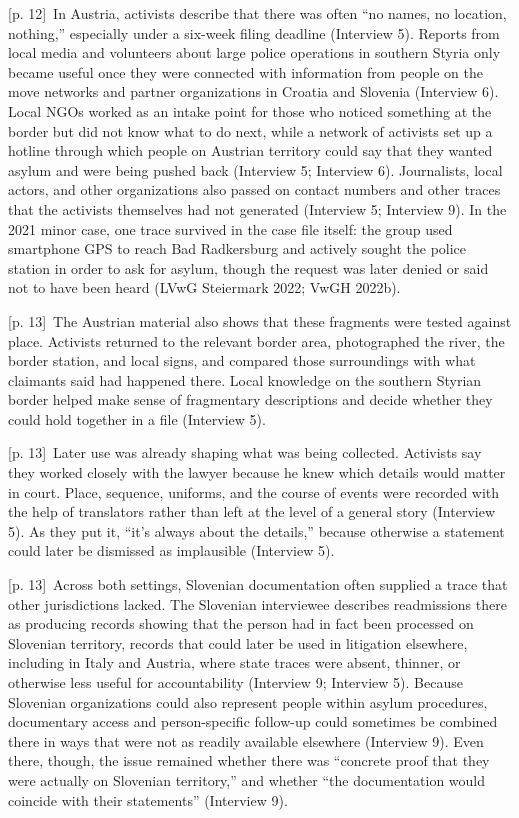 \documentclass[10pt,a4paper]{article}
\begin{document}
{\scriptsize\color{gray} [p. 12]}\ In Austria, activists describe that there was often “no names, no location, nothing,” especially under a six-week filing deadline (Interview 5). Reports from local media and volunteers about large police operations in southern Styria only became useful once they were connected with information from people on the move networks and partner organizations in Croatia and Slovenia (Interview 6). Local NGOs worked as an intake point for those who noticed something at the border but did not know what to do next, while a network of activists set up a hotline through which people on Austrian territory could say that they wanted asylum and were being pushed back (Interview 5; Interview 6). Journalists, local actors, and other organizations also passed on contact numbers and other traces that the activists themselves had not generated (Interview 5; Interview 9). In the 2021 minor case, one trace survived in the case file itself: the group used smartphone GPS to reach Bad Radkersburg and actively sought the police station in order to ask for asylum, though the request was later denied or said not to have been heard (LVwG Steiermark 2022; VwGH 2022b).\par
{\scriptsize\color{gray} [p. 13]}\ The Austrian material also shows that these fragments were tested against place. Activists returned to the relevant border area, photographed the river, the border station, and local signs, and compared those surroundings with what claimants said had happened there. Local knowledge on the southern Styrian border helped make sense of fragmentary descriptions and decide whether they could hold together in a file (Interview 5).\par
{\scriptsize\color{gray} [p. 13]}\ Later use was already shaping what was being collected. Activists say they worked closely with the lawyer because he knew which details would matter in court. Place, sequence, uniforms, and the course of events were recorded with the help of translators rather than left at the level of a general story (Interview 5). As they put it, “it’s always about the details,” because otherwise a statement could later be dismissed as implausible (Interview 5).\par
{\scriptsize\color{gray} [p. 13]}\ Across both settings, Slovenian documentation often supplied a trace that other jurisdictions lacked. The Slovenian interviewee describes readmissions there as producing records showing that the person had in fact been processed on Slovenian territory, records that could later be used in litigation elsewhere, including in Italy and Austria, where state traces were absent, thinner, or otherwise less useful for accountability (Interview 9; Interview 5). Because Slovenian organizations could also represent people within asylum procedures, documentary access and person-specific follow-up could sometimes be combined there in ways that were not as readily available elsewhere (Interview 9). Even there, though, the issue remained whether there was “concrete proof that they were actually on Slovenian territory,” and whether “the documentation would coincide with their statements” (Interview 9).\par
\end{document}
